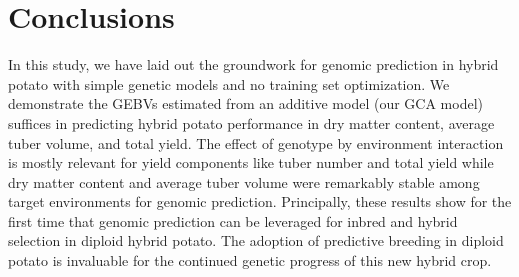 \section{Conclusions} %

In this study, we have laid out the groundwork for genomic prediction in hybrid potato with simple genetic models and no training set optimization. We demonstrate the GEBVs estimated from an additive model (our GCA model) suffices in predicting hybrid potato performance in dry matter content, average tuber volume, and total yield. The effect of genotype by environment interaction is mostly relevant for yield components like tuber number and total yield while dry matter content and average tuber volume were remarkably stable among target environments for genomic prediction. Principally, these results show for the first time that genomic prediction can be leveraged for inbred and hybrid selection in diploid hybrid potato. The adoption of predictive breeding in diploid potato is invaluable for the continued genetic progress of this new hybrid crop.


